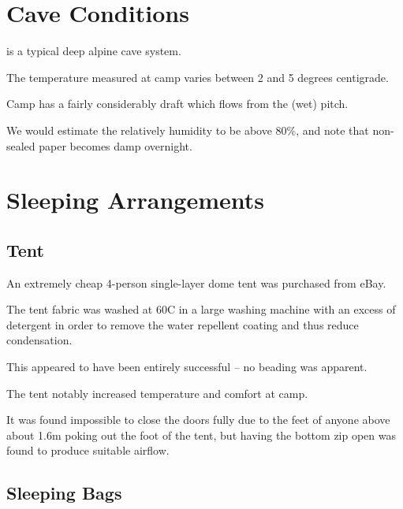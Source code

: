 \section{Cave Conditions}

 is a typical deep alpine cave system.

The temperature measured at camp varies between 2 and 5 degrees
centigrade.

Camp  has a fairly considerably draft which flows from the (wet)  pitch.

We would estimate the relatively humidity to be above 80\%, and note
that non-sealed paper becomes damp overnight.

\section{Sleeping Arrangements}

\subsection{Tent}

An extremely cheap 4-person single-layer dome tent was purchased from
eBay.

The tent fabric was washed at 60C in a large washing machine with an
excess of detergent in order to remove the water repellent coating and
thus reduce condensation.

This appeared to have been entirely successful -- no beading was
apparent.

The tent notably increased temperature and comfort at camp.

It was found impossible to close the doors fully due to the feet of
anyone above about 1.6m poking out the foot of the tent, but having the
bottom zip open was found to produce suitable airflow.


\subsection{Sleeping Bags}

